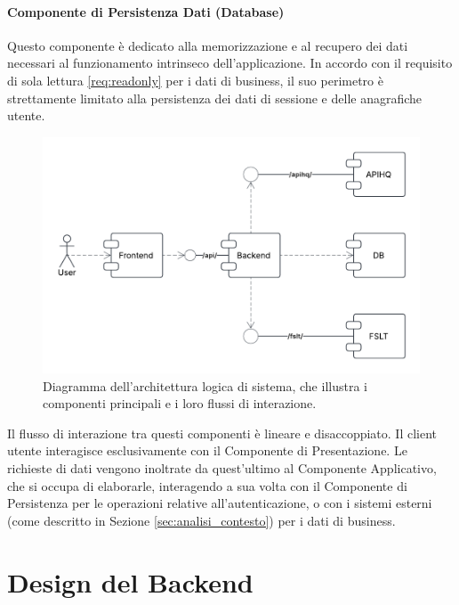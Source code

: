 \documentclass[12pt,a4paper,openright,twoside]{book}
\begin{document}
\paragraph{Componente di Persistenza Dati (Database)} Questo componente è dedicato alla memorizzazione e al recupero dei dati necessari al funzionamento intrinseco dell'applicazione. In accordo con il requisito di sola lettura \ref{req:readonly} per i dati di business, il suo perimetro è strettamente limitato alla persistenza dei dati di sessione e delle anagrafiche utente.


\begin{figure}[htbp]
    \centering
    \includegraphics[width=\textwidth]{figures/components.pdf}
    \caption{Diagramma dell'architettura logica di sistema, che illustra i componenti principali e i loro flussi di interazione.}
    \label{fig:logical_architecture_diagram}
\end{figure}

\FloatBarrier



Il flusso di interazione tra questi componenti è lineare e disaccoppiato. Il client utente interagisce esclusivamente con il Componente di Presentazione. Le richieste di dati vengono inoltrate da quest'ultimo al Componente Applicativo, che si occupa di elaborarle, interagendo a sua volta con il Componente di Persistenza per le operazioni relative all'autenticazione, o con i sistemi esterni (come descritto in Sezione \ref{sec:analisi_contesto}) per i dati di business.




\section{Design del Backend}
\label{sec:design_backend_oop}
\end{document}
